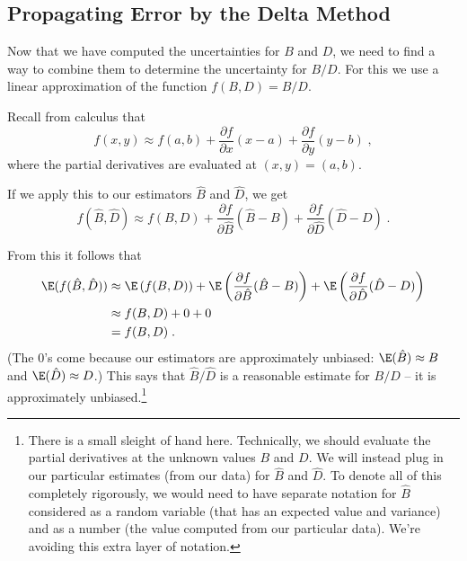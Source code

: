 \documentclass[twoside]{book}\usepackage[]{graphicx}\usepackage[]{xcolor}
\begin{document}
\subsection{Propagating Error by the Delta Method}
Now that we have computed the uncertainties for $B$ and $D$, we need to find a way to combine
them to determine the uncertainty for $B/D$.  For this we use a linear approximation of the function $f(B,D) = B/D$.

Recall from calculus that 
\[
f(x,y) \approx f(a, b)
+
\frac{\partial f}{\partial x} (x-a)
+
\frac{\partial f}{\partial y} (y-b) \;,
\]
where the partial derivatives are evaluated at $(x,y) = (a,b)$.

If we apply this to our estimators $\hat B$ and $\hat D$, we get
\[
f(\hat B,\hat D) \approx f( B, D ) 
+
\frac{\partial f}{\partial \hat B} (\hat B- B)
+
\frac{\partial f}{\partial \hat D} (\hat D- D)
\;.
\]

From this it follows that
\begin{align*}
	\E(f(\hat B,\hat D)) &\approx 
	\E\left(f( B, D)\right)
+
\E\left( \frac{\partial f}{\partial {\hat B}} (\hat B- B) \right)
+
\E\left( \frac{\partial f}{\partial \hat D} (\hat D- D) \right)
\\
&\approx f(B,D) + 0 + 0 
\\
&= f(B,D) \;.
\end{align*}
(The 0's come because our estimators are approximately unbiased: $\E(\hat B) \approx B$ and $\E(\hat D) \approx D$.)
This says that $\hat B/ \hat D$ is a reasonable estimate for $B/D$ -- it is approximately
unbiased.\footnote{There is a small sleight of hand here.  Technically, we should evaluate
the partial derivatives at the unknown values $B$ and $D$.  We will instead plug in our 
particular estimates (from our data) for $\hat B$ and $\hat D$.  To denote all of this 
completely rigorously, we would need to have separate notation for $\hat B$ considered
as a random variable (that has an expected value and variance) and as a number (the value
computed from our particular data).  We're avoiding this extra layer of notation.}
\end{document}
